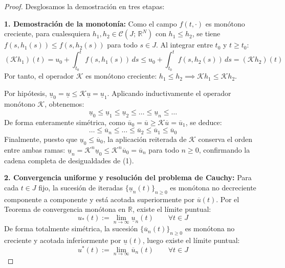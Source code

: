 \begin{proof}
    Desglosamos la demostración en tres etapas:

    \textbf{1. Demostración de la monotonía:}
    Como el campo $f(t, \cdot)$ es monótono creciente, para cualesquiera $h_1, h_2 \in \mathcal{C}(J; \, \mathbb{R}^N)$ con $h_1 \leq h_2$, se tiene $f(s, h_1(s)) \leq f(s, h_2(s))$ para todo $s \in J$. Al integrar entre $t_0$ y $t \geq t_0$:
    \[
        (\mathcal{K}h_1)(t) = u_0 + \int_{t_0}^t f(s, h_1(s)) \, ds \leq u_0 + \int_{t_0}^t f(s, h_2(s)) \, ds = (\mathcal{K}h_2)(t)
    \]
    Por tanto, el operador $\mathcal{K}$ es monótono creciente: $h_1 \leq h_2 \implies \mathcal{K}h_1 \leq \mathcal{K}h_2$.
    
    Por hipótesis, $\underline{u}_0 = \underline{u} \leq \mathcal{K}\underline{u} = \underline{u}_1$. Aplicando inductivamente el operador monótono $\mathcal{K}$, obtenemos:
    \[
        \underline{u}_0 \leq \underline{u}_1 \leq \underline{u}_2 \leq \dots \leq \underline{u}_n \leq \dots
    \]
    De forma enteramente simétrica, como $\overline{u}_0 = \overline{u} \geq \mathcal{K}\overline{u} = \overline{u}_1$, se deduce:
    \[
        \dots \leq \overline{u}_n \leq \dots \leq \overline{u}_2 \leq \overline{u}_1 \leq \overline{u}_0
    \]
    Finalmente, puesto que $\underline{u}_0 \leq \overline{u}_0$, la aplicación reiterada de $\mathcal{K}$ conserva el orden entre ambas ramas: $\underline{u}_n = \mathcal{K}^n\underline{u}_0 \leq \mathcal{K}^n\overline{u}_0 = \overline{u}_n$ para todo $n \geq 0$, confirmando la cadena completa de desigualdades de (1).

    \medskip

    \textbf{2. Convergencia uniforme y resolución del problema de Cauchy:}
    Para cada $t \in J$ fijo, la sucesión de iteradas $\{\underline{u}_n(t)\}_{n \geq 0}$ es monótona no decreciente componente a componente y está acotada superiormente por $\overline{u}(t)$. Por el Teorema de convergencia monótona en $\mathbb{R}$, existe el límite puntual:
    \[
        u_*(t) := \lim_{n \to \infty} \underline{u}_n(t) \qquad \forall t \in J
    \]
    De forma totalmente simétrica, la sucesión $\{\overline{u}_n(t)\}_{n \geq 0}$ es monótona no creciente y acotada inferiormente por $\underline{u}(t)$, luego existe el límite puntual:
    \[
        u^*(t) := \lim_{n \to \infty} \overline{u}_n(t) \qquad \forall t \in J
    \]
    

\end{proof}
